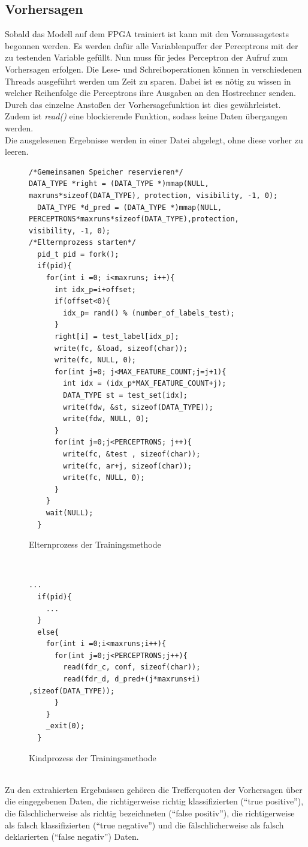 \subsection{Vorhersagen}
Sobald das Modell auf dem FPGA trainiert ist kann mit den Voraussagetests begonnen werden. Es werden dafür alle Variablenpuffer der Perceptrons mit der zu testenden Variable gefüllt. Nun muss für jedes Perceptron der Aufruf zum Vorhersagen erfolgen. Die Lese- und Schreiboperationen können in verschiedenen Threads ausgeführt werden um Zeit zu sparen. Dabei ist es nötig zu wissen in welcher Reihenfolge die Perceptrons ihre Ausgaben an den Hostrechner senden. Durch das einzelne Anstoßen der Vorhersagefunktion ist dies gewährleistet. Zudem ist \textit{read()} eine blockierende Funktion, sodass keine Daten übergangen werden.\\
Die ausgelesenen Ergebnisse werden in einer Datei abgelegt, ohne diese vorher zu leeren. \\
\begin{figure}[ht]
\centering
\begin{lstlisting}
/*Gemeinsamen Speicher reservieren*/
DATA_TYPE *right = (DATA_TYPE *)mmap(NULL, maxruns*sizeof(DATA_TYPE), protection, visibility, -1, 0);
  DATA_TYPE *d_pred = (DATA_TYPE *)mmap(NULL, PERCEPTRONS*maxruns*sizeof(DATA_TYPE),protection, visibility, -1, 0);
/*Elternprozess starten*/
  pid_t pid = fork();
  if(pid){
    for(int i =0; i<maxruns; i++){
      int idx_p=i+offset;
      if(offset<0){
        idx_p= rand() % (number_of_labels_test);
      }
      right[i] = test_label[idx_p];
      write(fc, &load, sizeof(char));
      write(fc, NULL, 0);
      for(int j=0; j<MAX_FEATURE_COUNT;j=j+1){
        int idx = (idx_p*MAX_FEATURE_COUNT+j);
        DATA_TYPE st = test_set[idx];
        write(fdw, &st, sizeof(DATA_TYPE));
        write(fdw, NULL, 0);
      }
      for(int j=0;j<PERCEPTRONS; j++){
        write(fc, &test , sizeof(char));
        write(fc, ar+j, sizeof(char));
        write(fc, NULL, 0);
      }
    }
    wait(NULL);
  }
\end{lstlisting}
\caption{Elternprozess der Trainingsmethode}
\end{figure}\\
\begin{figure}[ht]
\centering
\begin{lstlisting}
...
  if(pid){
  	...
  } 
  else{
    for(int i =0;i<maxruns;i++){
      for(int j=0;j<PERCEPTRONS;j++){
        read(fdr_c, conf, sizeof(char));
        read(fdr_d, d_pred+(j*maxruns+i) ,sizeof(DATA_TYPE));
      }
    }
    _exit(0);
  }
\end{lstlisting}
\caption{Kindprozess der Trainingsmethode}
\end{figure}\\
Zu den extrahierten Ergebnissen gehören die Trefferquoten der Vorhersagen über die eingegebenen Daten, die richtigerweise richtig klassifizierten ("`true positive"'), die fälschlicherweise als richtig bezeichneten  ("`false positiv"'), die richtigerweise als falsch klassifizierten  ("`true negative"') und die fälschlicherweise als falsch deklarierten ("`false negativ"') Daten.\\
